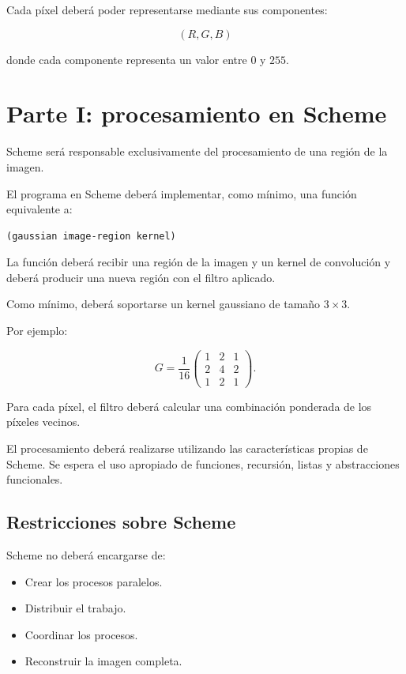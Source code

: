\documentclass[11pt,a4paper]{article}
\begin{document}
Cada píxel deberá poder representarse mediante sus componentes:

$$
(R,G,B)
$$

donde cada componente representa un valor entre $0$ y $255$.

\section{Parte I: procesamiento en Scheme}

Scheme será responsable exclusivamente del procesamiento de una región
de la imagen.

El programa en Scheme deberá implementar, como mínimo, una función
equivalente a:

\begin{lstlisting}
(gaussian image-region kernel)
\end{lstlisting}

La función deberá recibir una región de la imagen y un kernel de
convolución y deberá producir una nueva región con el filtro aplicado.

Como mínimo, deberá soportarse un kernel gaussiano de tamaño $3\times3$.

Por ejemplo:

$$
G=
\frac{1}{16}
\begin{pmatrix}
1&2&1\\
2&4&2\\
1&2&1
\end{pmatrix}.
$$

Para cada píxel, el filtro deberá calcular una combinación ponderada
de los píxeles vecinos.

El procesamiento deberá realizarse utilizando las características
propias de Scheme. Se espera el uso apropiado de funciones, recursión,
listas y abstracciones funcionales.

\subsection{Restricciones sobre Scheme}

Scheme no deberá encargarse de:

\begin{itemize}
\item Crear los procesos paralelos.
\item Distribuir el trabajo.
\item Coordinar los procesos.
\item Reconstruir la imagen completa.
\end{itemize}
\end{document}
